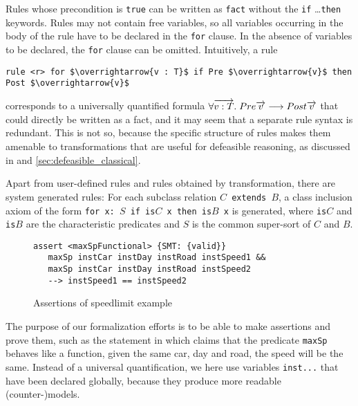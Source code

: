 Rules whose precondition is \texttt{true} can be written as \texttt{fact}
without the \texttt{if} \dots \texttt{then} keywords.
Rules may not contain free variables, so all variables occurring in the body of
the rule have to be declared in the \texttt{for} clause. In the absence of
variables to be declared, the \texttt{for} clause can be omitted. 
Intuitively, a rule
\begin{lstlisting}[frame=none,mathescape=true]
  rule <r> for $\overrightarrow{v : T}$ if Pre $\overrightarrow{v}$ then Post $\overrightarrow{v}$
\end{lstlisting}
corresponds to a universally quantified formula
$\forall \overrightarrow{v : T}.\; Pre \overrightarrow{v}
\longrightarrow Post \overrightarrow{v}$ that could directly be written as a fact,
and it may seem that a separate rule syntax is redundant. This is not so,
because the specific structure of rules makes them amenable to transformations
that are useful for defeasible reasoning, as discussed in 
 and \ref{sec:defeasible_classical}.

Apart from user-defined rules and rules obtained by transformation, there are
system generated rules: For each subclass relation \texttt{$C$ extends $B$}, a
class inclusion axiom of the form \texttt{for x: $S$ if is$C$ x then is$B$ x}
is generated, where \texttt{is$C$} and \texttt{is$B$} are the characteristic
predicates and $S$ is the common super-sort of $C$ and $B$.

\begin{figure}[h]
\begin{lstlisting}
assert <maxSpFunctional> {SMT: {valid}}
   maxSp instCar instDay instRoad instSpeed1 &&
   maxSp instCar instDay instRoad instSpeed2
   --> instSpeed1 == instSpeed2
\end{lstlisting}
  \caption{Assertions of speedlimit example}\label{fig:assertions_app}
\end{figure}


The purpose of our formalization efforts is to be able to make assertions
and prove them, such as the statement in  which claims
that the predicate 
\texttt{maxSp} behaves like a function, \ie{} given the same car, day and
road, the speed will be the same. Instead of a universal quantification, we
here use variables \texttt{inst...} that have been declared globally, because they
produce more readable (counter-)models. 



